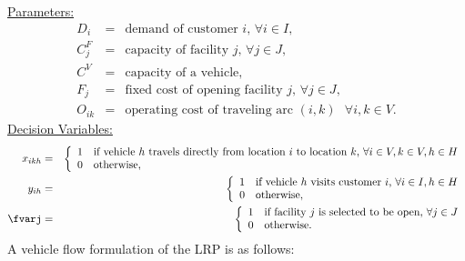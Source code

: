 \noindent\underline{Parameters:}
\begin{eqnarray*}
D_i & = & \mbox{demand of customer $i$, $\forall i \in I$}, \\
C^F_j & = & \mbox{capacity of facility $j$, $\forall j \in J$}, \\
C^V  & = & \mbox{capacity of a vehicle}, \\
F_j & = & \mbox{fixed cost of opening facility $j$, $\forall j \in J$}, \\
O_{ik} & = & \mbox{operating cost of traveling arc $(i,k)$ $\forall i,k \in V$}. 
\end{eqnarray*}
\noindent\underline{Decision Variables:}
\begin{eqnarray*}
x_{ikh} & = & \left\{ \begin{array}{ll}
                 1  & \mbox{if vehicle $h$ travels directly from location $i$ to location $k$, $\forall i \in V, k \in V, h \in H$}\\
                 0  & \mbox{otherwise},                                                  
                \end{array} 
              \right. \\
y_{ih} & = & \left\{ \begin{array}{ll}
                 1  & \mbox{if vehicle $h$ visits customer $i$, $\forall i \in I, h \in H$}\\
                 0  & \mbox{otherwise},                                                  
                \end{array} 
              \right. \\
\fvarj & = & \left\{ \begin{array}{ll}
                1  & \mbox{if facility $j$ is selected to be open, $\forall j \in J$}\\
                 0  & \mbox{otherwise}.                                                  
                \end{array}  
              \right. 
\end{eqnarray*}
A vehicle flow formulation of the LRP is as follows: 
